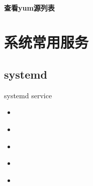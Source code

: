 \documentclass[letterpaper,10pt,english]{sphinxmanual}
\begin{document}
\subsubsection{查看yum源列表}
\label{\detokenize{software_manage/yum/yum_iso_local:id5}}
%
\begin{sphinxVerbatim}[commandchars=\\\{\}]
 
\end{sphinxVerbatim}

\noindent{}


\chapter{系统常用服务}
\label{\detokenize{common_service/readme:id1}}\label{\detokenize{common_service/readme::doc}}

\section{systemd}
\label{\detokenize{common_service/systemd_index:systemd}}\label{\detokenize{common_service/systemd_index::doc}}
systemd service

\begin{sphinxShadowBox}
\begin{itemize}
\item {} 
\label{\detokenize{common_service/systemd:id4}}{\hyperref[\detokenize{common_service/systemd:id1}]{}}

\item {} 
\label{\detokenize{common_service/systemd:id5}}{\hyperref[\detokenize{common_service/systemd:id2}]{}}

\item {} 
\label{\detokenize{common_service/systemd:id6}}{\hyperref[\detokenize{common_service/systemd:systemd}]{}}

\item {} 
\label{\detokenize{common_service/systemd:id7}}{\hyperref[\detokenize{common_service/systemd:id3}]{}}

\item {} 
\label{\detokenize{common_service/systemd:id8}}{\hyperref[\detokenize{common_service/systemd:sophroth-pxe}]{}}

\end{itemize}
\end{sphinxShadowBox}
\end{document}

